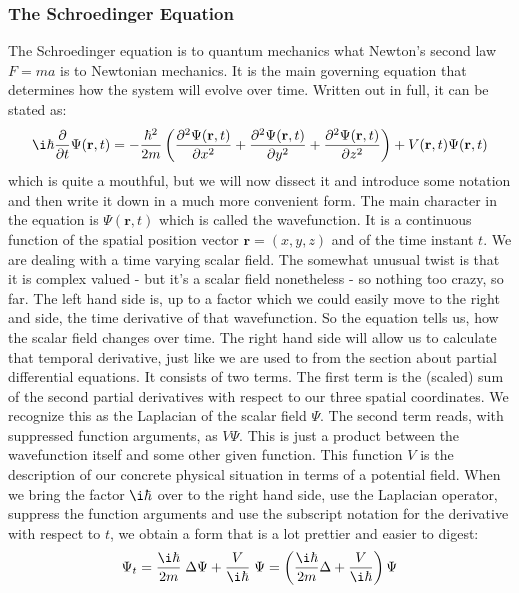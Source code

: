 \subsubsection{The Schroedinger Equation}
The  Schroedinger equation is to quantum mechanics what Newton's second law $F = m a$ is to Newtonian mechanics. It is the main governing equation that determines how the system will evolve over time. Written out in full, it can be stated as:
\begin{equation}
 \i \hbar \frac{\partial}{\partial t} \Psi(\mathbf{r}, t) =
 - \frac{\hbar^2}{2m} \left(
 \frac{\partial^2 \Psi(\mathbf{r}, t)}{\partial x^2} + 
 \frac{\partial^2 \Psi(\mathbf{r}, t)}{\partial y^2} + 
 \frac{\partial^2 \Psi(\mathbf{r}, t)}{\partial z^2}
 \right)
 +
 V(\mathbf{r}, t) \Psi(\mathbf{r}, t)
\end{equation}
which is quite a mouthful, but we will now dissect it and introduce some notation and then write it down in a much more convenient form. The main character in the equation is $\Psi(\mathbf{r}, t)$ which is called the wavefunction. It is a continuous function of the spatial position vector $\mathbf{r} = (x,y,z)$ and of the time instant $t$. We are dealing with a time varying scalar field. The somewhat unusual twist is that it is complex valued - but it's a scalar field nonetheless - so nothing too crazy, so far. The left hand side is, up to a factor which we could easily move to the right and side, the time derivative of that wavefunction. So the equation tells us, how the scalar field changes over time. The right hand side will allow us to calculate that temporal derivative, just like we are used to from the section about partial differential equations. It consists of two terms. The first term is the (scaled) sum of the second partial derivatives with respect to our three spatial coordinates. We recognize this as the Laplacian of the scalar field $\Psi$. The second term reads, with suppressed function arguments, as $V \Psi$. This is just a product between the wavefunction itself and some other given function. This function $V$ is the description of our concrete physical situation in terms of a potential field. When we bring the factor $\i \hbar$ over to the right hand side, use the Laplacian operator, suppress the function arguments and use the subscript notation for the derivative with respect to $t$, we obtain a form that is a lot prettier and easier to digest:
\begin{equation}
\Psi_t = \frac{\i \hbar}{2m} \; \Delta \Psi + \frac{V}{\i \hbar} \; \Psi
       = \left(\frac{\i \hbar}{2m} \Delta  + \frac{V}{\i \hbar} \right)  \Psi
\end{equation}
